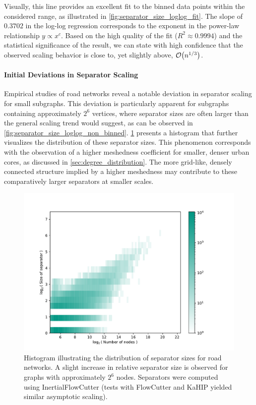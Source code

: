 Visually, this line provides an excellent fit to the binned data points within the considered range, as illustrated in \cref{fig:separator_size_loglog_fit}.
The slope of \( 0.3702 \) in the log-log regression corresponds to the exponent in the power-law relationship \( y \propto x^c \).
Based on the high quality of the fit (\( R^2 \approx 0.9994 \)) and the statistical significance of the result, we can state with high confidence that the observed scaling behavior is close to, yet slightly above, \( \mathcal{O}\!\left(n^{1/3}\right) \).

\paragraph{Initial Deviations in Separator Scaling}
Empirical studies of road networks reveal a notable deviation in separator scaling for small subgraphs.
This deviation is particularly apparent for subgraphs containing approximately \(2^6\) vertices, where separator sizes are often larger than the general scaling trend would suggest, as can be observed in \cref{fig:separator_size_loglog_non_binned}.
\cref{fig:real_europe_hist} presents a histogram that further visualizes the distribution of these separator sizes.
This phenomenon corresponds with the observation of a higher meshedness coefficient for smaller, denser urban cores, as discussed in \cref{sec:degree_distribution}.
The more grid-like, densely connected structure implied by a higher meshedness may contribute to these comparatively larger separators at smaller scales.

\begin{figure}[tbhp]
    \centering
    \includegraphics[width=0.7\linewidth]{graphics/Germany-hist.pdf}
    \caption{Histogram illustrating the distribution of separator sizes for road networks. A slight increase in relative separator size is observed for graphs with approximately \(2^6\) nodes. Separators were computed using InertialFlowCutter (tests with FlowCutter and KaHIP yielded similar asymptotic scaling).}
    \label{fig:real_europe_hist}
\end{figure}

